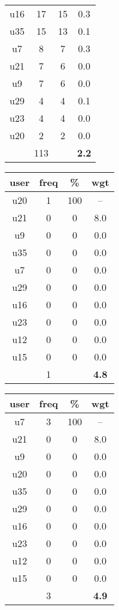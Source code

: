 \begin{appendices}
\begin{table}
\begin{tabular}{ |c|c|c|c| }
	u16 & 17 & 15 & 0.3 \\
	u35 & 15 & 13 & 0.1 \\
	u7 & 8 & 7 & 0.3 \\
	u21 & 7 & 6 & 0.0 \\
	u9 & 7 & 6 & 0.0 \\
	u29 & 4 & 4 & 0.1 \\
	u23 & 4 & 4 & 0.0 \\
	u20 & 2 & 2 & 0.0 \\
	 & 113 & & \textbf{2.2} \\
	\hline
\end{tabular}
\begin{tabular}{ |c|c|c|c| }
	\hline
	\textbf{user} & \textbf{freq} & \textbf{\%} & \textbf{wgt} \\
	\hline
	u20 & 1 & 100 & -- \\
	u21 & 0 & 0 & 8.0 \\
	u9 & 0 & 0 & 0.0 \\
	u35 & 0 & 0 & 0.0 \\
	u7 & 0 & 0 & 0.0 \\
	u29 & 0 & 0 & 0.0 \\
	u16 & 0 & 0 & 0.0 \\
	u23 & 0 & 0 & 0.0 \\
	u12 & 0 & 0 & 0.0 \\
	u15 & 0 & 0 & 0.0 \\
	 & 1 & & \textbf{4.8} \\
	\hline
\end{tabular}
\begin{tabular}{ |c|c|c|c| }
	\hline
	\textbf{user} & \textbf{freq} & \textbf{\%} & \textbf{wgt} \\
	\hline
	u7 & 3 & 100 & -- \\
	u21 & 0 & 0 & 8.0 \\
	u9 & 0 & 0 & 0.0 \\
	u20 & 0 & 0 & 0.0 \\
	u35 & 0 & 0 & 0.0 \\
	u29 & 0 & 0 & 0.0 \\
	u16 & 0 & 0 & 0.0 \\
	u23 & 0 & 0 & 0.0 \\
	u12 & 0 & 0 & 0.0 \\
	u15 & 0 & 0 & 0.0 \\
	 & 3 & & \textbf{4.9} \\
	\hline
\end{tabular}

\end{table}
\end{appendices}
